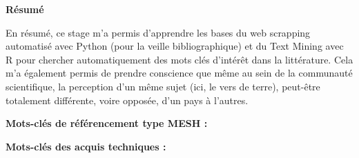 \documentclass{book}
\begin{document}
\newpage
\thispagestyle{empty}
\mbox{} %


\newpage
\thispagestyle{empty}
\begin{center}
    \huge{\textbf{Résumé}}
\end{center}

\vspace{1cm}
En résumé, ce stage m’a permis d'apprendre les bases du web scrapping
automatisé avec Python (pour la veille bibliographique) et du Text Mining avec
R pour chercher automatiquement des mots clés d'intérêt dans la littérature.
Cela m'a également permis de prendre conscience que même au sein de la
communauté scientifique, la perception d'un même sujet (ici, le vers de terre),
peut-être totalement différente, voire opposée, d'un pays à l'autres.

\vspace{\baselineskip} %
\par
\textbf{Mots-clés de référencement type MESH :}
\vspace{\baselineskip} %
\par
\textbf{Mots-clés des acquis techniques : }
\end{document}
